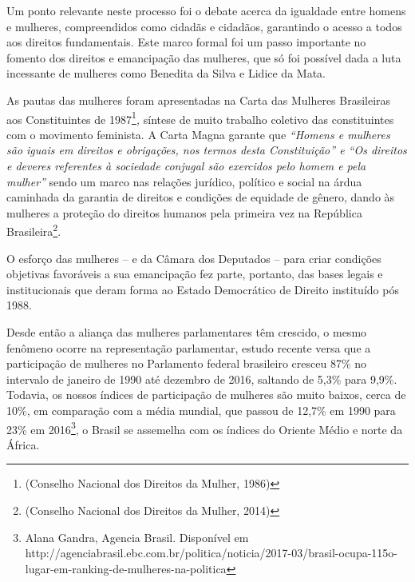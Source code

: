 Um ponto relevante neste processo foi o debate acerca da igualdade entre
homens e mulheres, compreendidos como cidadãs e cidadãos, garantindo o
acesso a todos aos direitos fundamentais. Este marco formal foi um passo
importante no fomento dos direitos e emancipação das mulheres, que só
foi possível dada a luta incessante de mulheres como Benedita da Silva e
Lidice da Mata.

As pautas das mulheres foram apresentadas na Carta das Mulheres
Brasileiras aos Constituintes de 1987\footnote{(Conselho Nacional dos
  Direitos da Mulher, 1986)}\emph{,} síntese de muito trabalho coletivo
das constituintes com o movimento feminista. A Carta Magna garante que
\emph{``Homens e mulheres são iguais em direitos e obrigações, nos
termos desta Constituição'' e ``Os direitos e deveres referentes à
sociedade conjugal são exercidos pelo homem e pela mulher''} sendo um
marco nas relações jurídico, político e social na árdua caminhada da
garantia de direitos e condições de equidade de gênero, dando às
mulheres a proteção do direitos humanos pela primeira vez na República
Brasileira\footnote{(Conselho Nacional dos Direitos da Mulher, 2014)}.

O esforço das mulheres -- e da Câmara dos Deputados -- para criar
condições objetivas favoráveis a sua emancipação fez parte, portanto,
das bases legais e institucionais que deram forma ao Estado Democrático
de Direito instituído pós 1988.

Desde então a aliança das mulheres parlamentares têm crescido, o mesmo
fenômeno ocorre na representação parlamentar, estudo recente versa que a
participação de mulheres no Parlamento federal brasileiro cresceu 87\%
no intervalo de janeiro de 1990 até dezembro de 2016, saltando de 5,3\%
para 9,9\%. Todavia, os nossos índices de participação de mulheres são
muito baixos, cerca de 10\%, em comparação com a média mundial, que
passou de 12,7\% em 1990 para 23\% em 2016\footnote{Alana Gandra,
  Agencia Brasil. Disponível em
  http://agenciabrasil.ebc.com.br/politica/noticia/2017-03/brasil-ocupa-115o-lugar-em-ranking-de-mulheres-na-politica},
o Brasil se assemelha com os índices do Oriente Médio e norte da África.

